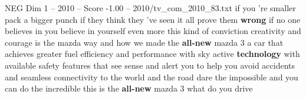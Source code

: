 \begin{textsample}{NEG Dim 1 – 2010 – Score -1.00 – 2010/tv\_com\_2010\_83.txt}  \label{ex:f1_neg_035}
if you 're smaller pack a bigger punch if they think they 've seen it all prove them \textbf{wrong} if no one believes in you believe in yourself even more this kind of conviction creativity and courage is the mazda way and how we made the \textbf{all-new} mazda 3 a car that achieves greater fuel efficiency and performance with sky active \textbf{technology} with available safety features that see sense and alert you to help you avoid accidents and seamless connectivity to the world and the road dare the impossible and you can do the incredible this is the \textbf{all-new} mazda 3 what do you drive

\end{textsample}
